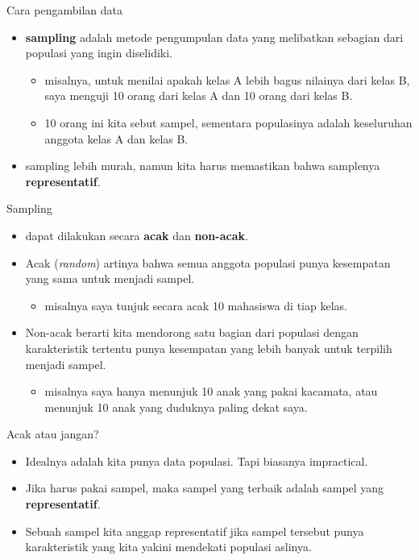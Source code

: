 \documentclass[
  ignorenonframetext,
]{beamer}
\providecommand{\tightlist}{%
  \setlength{\itemsep}{0pt}\setlength{\parskip}{0pt}}\usepackage{longtable,booktabs,array}
\begin{document}
\begin{frame}{Cara pengambilan data}
\label{cara-pengambilan-data-1}
\begin{itemize}
\item
  \textbf{sampling} adalah metode pengumpulan data yang melibatkan
  sebagian dari populasi yang ingin diselidiki.

  \begin{itemize}
  \item
    misalnya, untuk menilai apakah kelas A lebih bagus nilainya dari
    kelas B, saya menguji 10 orang dari kelas A dan 10 orang dari kelas
    B.
  \item
    10 orang ini kita sebut sampel, sementara populasinya adalah
    keseluruhan anggota kelas A dan kelas B.
  \end{itemize}
\item
  sampling lebih murah, namun kita harus memastikan bahwa samplenya
  \textbf{representatif}.
\end{itemize}
\end{frame}

\begin{frame}{Sampling}
\label{sampling}
\begin{itemize}
\item
  dapat dilakukan secara \textbf{acak} dan \textbf{non-acak}.
\item
  Acak (\emph{random}) artinya bahwa semua anggota populasi punya
  kesempatan yang sama untuk menjadi sampel.

  \begin{itemize}
  \tightlist
  \item
    misalnya saya tunjuk secara acak 10 mahasiswa di tiap kelas.
  \end{itemize}
\item
  Non-acak berarti kita mendorong satu bagian dari populasi dengan
  karakteristik tertentu punya kesempatan yang lebih banyak untuk
  terpilih menjadi sampel.

  \begin{itemize}
  \tightlist
  \item
    misalnya saya hanya menunjuk 10 anak yang pakai kacamata, atau
    menunjuk 10 anak yang duduknya paling dekat saya.
  \end{itemize}
\end{itemize}
\end{frame}

\begin{frame}{Acak atau jangan?}
\label{acak-atau-jangan}
\begin{itemize}
\item
  Idealnya adalah kita punya data populasi. Tapi biasanya impractical.
\item
  Jika harus pakai sampel, maka sampel yang terbaik adalah sampel yang
  \textbf{representatif}.
\item
  Sebuah sampel kita anggap representatif jika sampel tersebut punya
  karakteristik yang kita yakini mendekati populasi aslinya.
\end{itemize}
\end{frame}
\end{document}
